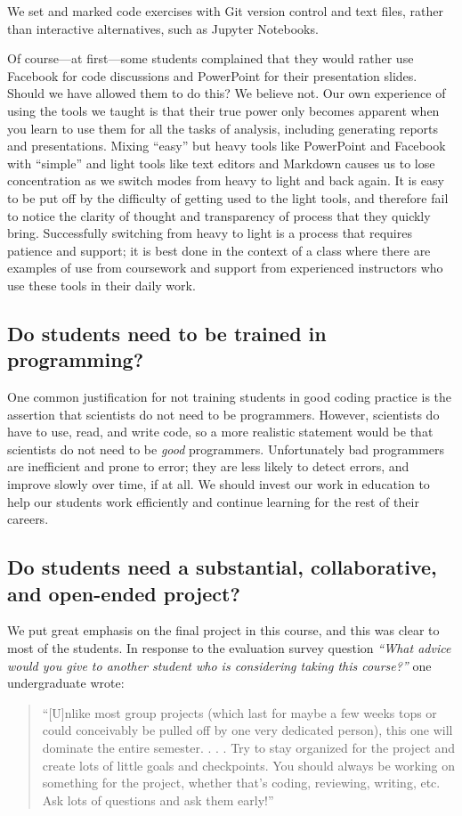 We set and marked code exercises with Git version control and text files,
rather than interactive alternatives, such as Jupyter Notebooks.

Of course---at first---some students complained that they would rather use
Facebook for code discussions and PowerPoint for their presentation slides.
Should we have allowed them to do this?  We believe not.  Our own experience
of using the tools we taught is that their true power only becomes apparent
when you learn to use them for all the tasks of analysis, including generating
reports and presentations.  Mixing ``easy'' but heavy tools like PowerPoint
and Facebook with ``simple'' and light tools like text editors and Markdown
causes us to lose concentration as we switch modes from heavy to light and
back again. It is easy to be put off by the difficulty of getting used to the
light tools, and therefore fail to notice the clarity of thought and
transparency of process that they quickly bring.  Successfully switching from
heavy to light is a process that requires patience and support; it is best
done in the context of a class where there are examples of use from coursework
and support from experienced instructors who use these tools in their daily
work.

\subsection{Do students need to be trained in programming?}

One common justification for not training students in good coding practice is
the assertion that scientists do not need to be programmers.  However, scientists do
have to use, read, and write code, so a more realistic 
statement would be that scientists do not need to be \emph{good} programmers.
Unfortunately bad programmers are inefficient and prone to error; they are
less likely to detect errors, and improve slowly over time, if at all.  We
should invest our work in education to help our students work efficiently and
continue learning for the rest of their careers.

\subsection{Do students need a substantial, collaborative, and open-ended project?}

We put great emphasis on the final project in this course, and this was clear
to most of the students.  In response to the evaluation survey question
\emph{``What advice would you give to another student who is considering taking this course?''}
one undergraduate wrote:
\begin{quotation}
``[U]nlike most group projects (which last for maybe a few weeks tops or
could conceivably be pulled off by one very dedicated person), this one will
dominate the entire semester. . . . Try to stay organized for the project and
create lots of little goals and checkpoints. You should always be working on
something for the project, whether that's coding, reviewing, writing, etc. Ask
lots of questions and ask them early!''
\end{quotation}

